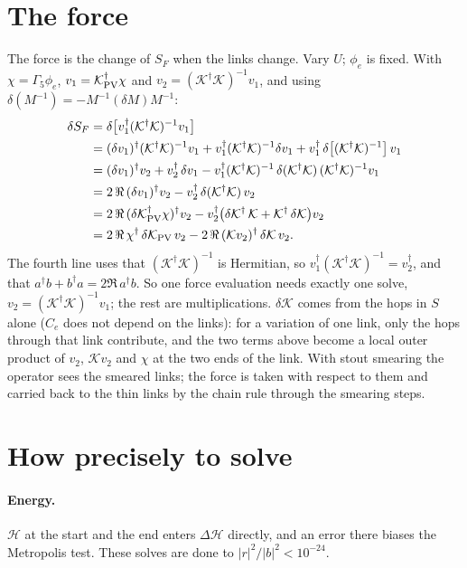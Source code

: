 \documentclass[11pt,a4paper]{article}
\numberwithin{equation}{section}
\newcommand{\dg}{^{\dagger}}
\newcommand{\Gfive}{\Gamma_5}
\newcommand{\Ce}{C_{e}}
\begin{document}
\section{The force}
The force is the change of $S_F$ when the links change. Vary $U$; $\phi_e$ is fixed. With
$\chi=\Gfive\phi_e$, $v_1=\mathcal K_{\rm PV}\dg\chi$ and $v_2=(\mathcal K\dg \mathcal K)^{-1}v_1$, and using
$\delta(M^{-1})=-M^{-1}(\delta M)M^{-1}$:
\begin{align}
\delta S_F&=\delta\big[v_1\dg(\mathcal K\dg \mathcal K)^{-1}v_1\big]\nonumber\\
&=(\delta v_1)\dg(\mathcal K\dg \mathcal K)^{-1}v_1+v_1\dg(\mathcal K\dg \mathcal K)^{-1}\delta v_1+v_1\dg\,\delta\big[(\mathcal K\dg \mathcal K)^{-1}\big]\,v_1\nonumber\\
&=(\delta v_1)\dg v_2+v_2\dg\,\delta v_1-v_1\dg(\mathcal K\dg \mathcal K)^{-1}\,\delta(\mathcal K\dg \mathcal K)\,(\mathcal K\dg \mathcal K)^{-1}v_1\nonumber\\
&=2\,\Re\,(\delta v_1)\dg v_2-v_2\dg\,\delta(\mathcal K\dg \mathcal K)\,v_2\nonumber\\
&=2\,\Re\,(\delta \mathcal K_{\rm PV}\dg\chi)\dg v_2-v_2\dg\big(\delta \mathcal K\dg\,\mathcal K+\mathcal K\dg\,\delta \mathcal K\big)v_2\nonumber\\
&=2\,\Re\,\chi\dg\,\delta \mathcal K_{\rm PV}\,v_2-2\,\Re\,(\mathcal Kv_2)\dg\,\delta \mathcal K\,v_2 .
\end{align}
The fourth line uses that $(\mathcal K\dg\mathcal K)^{-1}$ is Hermitian, so
$v_1\dg(\mathcal K\dg\mathcal K)^{-1}=v_2\dg$, and that $a\dg b+b\dg a=2\Re\,a\dg b$. So one force
evaluation needs exactly one solve, $v_2=(\mathcal K\dg \mathcal K)^{-1}v_1$; the rest are
multiplications. $\delta \mathcal K$ comes from the hops in $S$ alone ($\Ce$ does not depend on the links):
for a variation of one link, only the hops through that link contribute, and the two terms above
become a local outer product of $v_2$, $\mathcal Kv_2$ and $\chi$ at the two ends of the link. With stout
smearing the operator sees the smeared links; the force is taken with respect to them and carried
back to the thin links by the chain rule through the smearing steps.

\section{How precisely to solve}
\paragraph{Energy.} $\mathcal H$ at the start and the end enters $\Delta\mathcal H$ directly, and an
error there biases the Metropolis test. These solves are done to $|r|^2/|b|^2<10^{-24}$.
\end{document}
